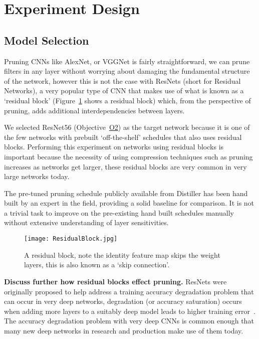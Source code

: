 \documentclass[../Dissertation.tex]{subfiles}
\begin{document}
\newpage

\section{Experiment Design}\label{sec:ExperimentDesign}

\subsection{Model Selection}\label{sec:ModelSelection}

Pruning CNNs like AlexNet, or VGGNet is fairly straightforward, we can prune filters in any layer without worrying about damaging the fundamental structure of the network, however this is not the case with ResNets (short for Residual Networks),  a very popular type of CNN that makes use of what is known as a `residual block' (Figure~\ref{fig:ResidualBlock} shows a residual block) which, from the perspective of pruning, adds additional interdependencies between layers.

We selected ResNet56 (Objective~\hyperref[obj:obj:ModelSel]{O2}) as the target network because it is one of the few networks with prebuilt `off-the-shelf' schedules that also uses residual blocks. 
Performing this experiment on networks using residual blocks is important because the necessity of using compression techniques such as pruning increases as networks get larger, these residual blocks are very common in very large networks today. 

The pre-tuned pruning schedule publicly available from Distiller has been hand built by an expert in the field, providing a solid baseline for comparison.
It is not a trivial task to improve on the pre-existing hand built schedules manually without extensive understanding of layer sensitivities.  

\begin{figure}[H]
    \centering
    \texttt{[image: ResidualBlock.jpg]}
    \caption{A residual block, note the identity feature map skips the weight layers, this is also known as a `skip connection'.}
    \label{fig:ResidualBlock}
\end{figure}

\textbf{\color{red}Discuss further how residual blocks effect pruning.}
ResNets were originally proposed to help address a training accuracy degradation problem that can occur in very deep networks, degradation (or accuracy saturation) occurs when adding more layers to a suitably deep model leads to higher training error~\autocite{heDeepResidualLearning2016}.
The accuracy degradation problem with very deep CNNs is common enough that many new deep networks in research and production make use of them today.
\end{document}

